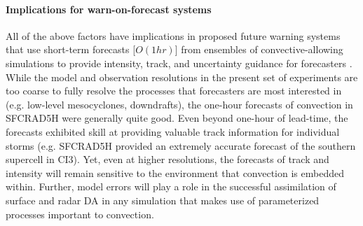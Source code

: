\paragraph{Implications for warn-on-forecast systems}
All of the above factors have implications in proposed future warning systems that use short-term forecasts [\(O(1hr)\)] from ensembles of convective-allowing simulations to provide intensity, track, and uncertainty guidance for forecasters \citep{stensrudetal09a}. While the model and observation resolutions in the present set of experiments are too coarse to fully resolve the processes that forecasters are most interested in (e.g. low-level mesocyclones, downdrafts), the one-hour forecasts of convection in SFCRAD5H were generally quite good. Even beyond one-hour of lead-time, the forecasts exhibited skill at providing valuable track information for individual storms (e.g. SFCRAD5H provided an extremely accurate forecast of the southern supercell in CI3).  Yet, even at higher resolutions, the forecasts of track and intensity will remain sensitive to the environment that convection is embedded within. Further, model errors will play a role in the successful assimilation of surface and radar DA in any simulation that makes use of parameterized processes important to convection.